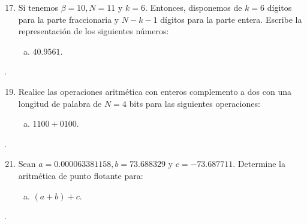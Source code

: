 \documentclass[
	spanish,
	8pt,
	utf8,
	xcolor=table,
	handout,
	aspectratio=169,
	professionalfonts,
	mathserif,
	leqno,
]{beamer}
\begin{document}
\begin{frame}
	\begin{enumerate}\setcounter{enumi}{16}
		\item

		      Si tenemos $\beta=10, N=11$ y $k=6$.
		      Entonces, disponemos de $k=6$ dígitos para la parte
		      fraccionaria y $N-k-1$ dígitos para la parte entera.
		      Escribe la representación de los siguientes números:

		      \begin{enumerate}[b)]
			      \item

			            $40.9561$.
		      \end{enumerate}
	\end{enumerate}

	\begin{solution}
		.
	\end{solution}
\end{frame}

\begin{frame}
	\begin{enumerate}\setcounter{enumi}{18}
		\item

		      Realice las operaciones aritmética con enteros complemento
		      a dos con una longitud de palabra de $N=4$ bits para las
		      siguientes operaciones:

		      \begin{enumerate}[b)]
			      \item

			            $1100+0100$.
		      \end{enumerate}
	\end{enumerate}

	\begin{solution}
		.
	\end{solution}
\end{frame}

\begin{frame}
	\begin{enumerate}\setcounter{enumi}{20}
		\item

		      Sean $a=0.000063381158, b=73.688329$ y $c=-73.687711$.
		      Determine la aritmética de punto flotante para:

		      \begin{enumerate}[b)]
			      \item

			            $\left(a+b\right)+c$.
		      \end{enumerate}
	\end{enumerate}

	\begin{solution}
		.
	\end{solution}
\end{frame}
\end{document}
